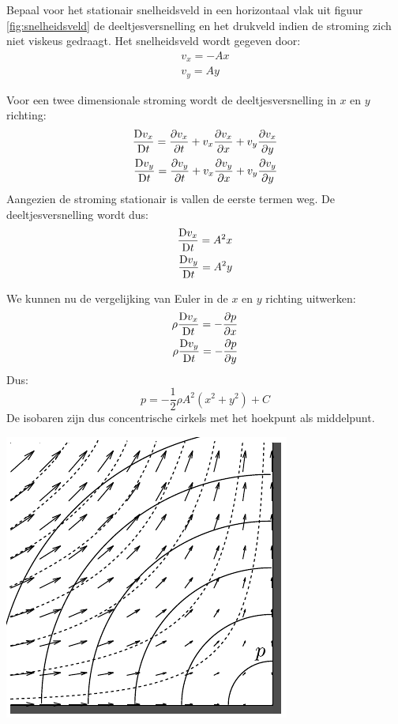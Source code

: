 \begin{voorbeeld}
	Bepaal voor het stationair snelheidsveld in een horizontaal vlak uit figuur \ref{fig:snelheidsveld} de deeltjesversnelling en het drukveld indien de stroming zich niet viskeus gedraagt. Het snelheidsveld wordt gegeven door:
	\begin{align*}
		v_x = -A x \\
		v_y = A y
	\end{align*}
	
	Voor een twee dimensionale stroming wordt de deeltjesversnelling in $x$ en $y$ richting:
	\begin{align*}
		\frac{\mathrm{D} v_x}{\mathrm{D} t} = \frac{\partial v_x}{\partial t} + v_x \frac{\partial v_x}{\partial x} + v_y \frac{\partial v_x}{\partial y} \\
		\frac{\mathrm{D} v_y}{\mathrm{D} t} = \frac{\partial v_y}{\partial t} + v_x \frac{\partial v_y}{\partial x} + v_y \frac{\partial v_y}{\partial y}
	\end{align*}
	Aangezien de stroming stationair is vallen de eerste termen weg. De deeltjesversnelling wordt dus:
	\begin{align*}
		\frac{\mathrm{D} v_x}{\mathrm{D} t} = A^2 x \\
		\frac{\mathrm{D} v_y}{\mathrm{D} t} = A^2 y
	\end{align*}
	
	We kunnen nu de	vergelijking van Euler in de $x$ en $y$ richting uitwerken:
	\begin{align*}
		\rho \frac{\mathrm{D} v_x}{\mathrm{D} t} = -\frac{\partial p}{\partial x} \\
		\rho \frac{\mathrm{D} v_y}{\mathrm{D} t} = -\frac{\partial p}{\partial y}
	\end{align*}
	Dus:
	\begin{equation*}
		p = -\frac{1}{2} \rho A^2 \left(x^2 +y^2 \right) + C
	\end{equation*}
	De isobaren zijn dus concentrische cirkels met het hoekpunt als middelpunt.
	\begin{center}
		\includegraphics{fig/deeltjesvergelijkingen/Snelheidsveld_en_drukveld}
	\end{center}
\end{voorbeeld}
